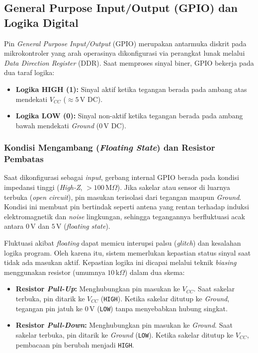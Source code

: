 \subsection{General Purpose Input/Output (GPIO) dan Logika Digital}

Pin \textit{General Purpose Input/Output} (GPIO) merupakan antarmuka diskrit pada mikrokontroler yang arah operasinya dikonfigurasi via perangkat lunak melalui \textit{Data Direction Register} (DDR). Saat memproses sinyal biner, GPIO bekerja pada dua taraf logika:
\begin{itemize}
    \item \textbf{Logika HIGH (1):} Sinyal aktif ketika tegangan berada pada ambang atas mendekati $V_{CC}$ ($\approx 5\,\text{V DC}$).
    \item \textbf{Logika LOW (0):} Sinyal non-aktif ketika tegangan berada pada ambang bawah mendekati \textit{Ground} ($0\,\text{V DC}$).
\end{itemize}

\subsubsection{Kondisi Mengambang (\textit{Floating State}) dan Resistor Pembatas}

Saat dikonfigurasi sebagai \textit{input}, gerbang internal GPIO berada pada kondisi impedansi tinggi (\textit{High-Z}, $>100\,\text{M}\Omega$). Jika sakelar atau sensor di luarnya terbuka (\textit{open circuit}), pin masukan terisolasi dari tegangan maupun \textit{Ground}. Kondisi ini membuat pin bertindak seperti antena yang rentan terhadap induksi elektromagnetik dan \textit{noise} lingkungan, sehingga tegangannya berfluktuasi acak antara $0\,\text{V}$ dan $5\,\text{V}$ (\textit{floating state}).

Fluktuasi akibat \textit{floating} dapat memicu interupsi palsu (\textit{glitch}) dan kesalahan logika program. Oleh karena itu, sistem memerlukan kepastian status sinyal saat tidak ada masukan aktif. Kepastian logika ini dicapai melalui teknik \textit{biasing} menggunakan resistor (umumnya $10\,\text{k}\Omega$) dalam dua skema:
\begin{itemize}
    \item \textbf{Resistor \textit{Pull-Up}:} Menghubungkan pin masukan ke $V_{CC}$. Saat sakelar terbuka, pin ditarik ke $V_{CC}$ (\texttt{HIGH}). Ketika sakelar ditutup ke \textit{Ground}, tegangan pin jatuh ke $0\,\text{V}$ (\texttt{LOW}) tanpa menyebabkan hubung singkat.
    \item \textbf{Resistor \textit{Pull-Down}:} Menghubungkan pin masukan ke \textit{Ground}. Saat sakelar terbuka, pin ditarik ke \textit{Ground} (\texttt{LOW}). Ketika sakelar ditutup ke $V_{CC}$, pembacaan pin berubah menjadi \texttt{HIGH}.
\end{itemize}


